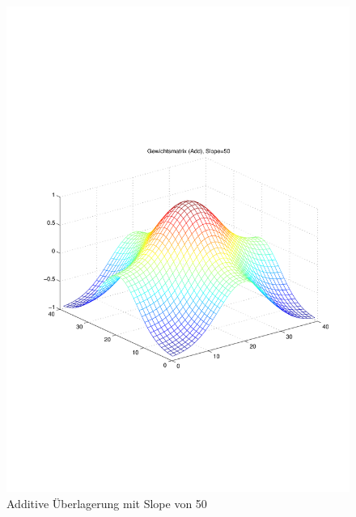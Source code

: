 \begin{figure}[hbt]
\begin{minipage}{0.5 \textwidth}
		\includegraphics[width=\textwidth]{./Bilder/Auswertung/Gewichtsmatrix/Gewichtsmatrix_Add_Slope_50}
		\caption{Additive Überlagerung mit Slope von 50}
		\label{Add50}
	\end{minipage}
\end{figure}

